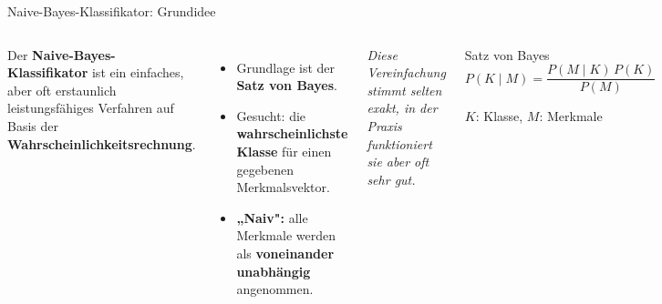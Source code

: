 

\begin{frame}{Naive-Bayes-Klassifikator: Grundidee}
\begin{columns}
Der \textbf{Naive-Bayes-Klassifikator} ist ein einfaches, aber oft
erstaunlich leistungsfähiges Verfahren auf Basis der
\textbf{Wahrscheinlichkeitsrechnung}.

\vspace{0.4em}
\begin{itemize}
  \item Grundlage ist der \textbf{Satz von Bayes}.
  \item Gesucht: die \textbf{wahrscheinlichste Klasse} für einen gegebenen
        Merkmalsvektor.
  \item \textbf{„Naiv":} alle Merkmale werden als \textbf{voneinander
        unabhängig} angenommen.
\end{itemize}

\vspace{0.4em}
{\footnotesize\itshape Diese Vereinfachung stimmt selten exakt, in der
Praxis funktioniert sie aber oft sehr gut.}

\begin{blockC1}{Satz von Bayes}
\centering
\vspace{0.2em}
\[
  P(K \mid M) = \frac{P(M \mid K)\, P(K)}{P(M)}
\]
\vspace{0.2em}

{\footnotesize $K$: Klasse, $M$: Merkmale}
\end{blockC1}
\end{columns}
\end{frame}


